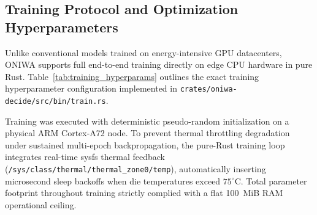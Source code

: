 \documentclass[10pt,twocolumn,letterpaper]{article}
\begin{document}
\subsection{Training Protocol and Optimization Hyperparameters}
Unlike conventional models trained on energy-intensive GPU datacenters, ONIWA supports full end-to-end training directly on edge CPU hardware in pure Rust. Table~\ref{tab:training_hyperparams} outlines the exact training hyperparameter configuration implemented in \texttt{crates/oniwa-decide/src/bin/train.rs}.

\begin{table}[htbp]
\centering
\caption{Training hyperparameters and optimization configuration.}
\label{tab:training_hyperparams}
\end{table}

Training was executed with deterministic pseudo-random initialization on a physical ARM Cortex-A72 node. To prevent thermal throttling degradation under sustained multi-epoch backpropagation, the pure-Rust training loop integrates real-time sysfs thermal feedback (\texttt{/sys/class/thermal/thermal\_zone0/temp}), automatically inserting microsecond sleep backoffs when die temperatures exceed $75^\circ\text{C}$. Total parameter footprint throughout training strictly complied with a flat 100~MiB RAM operational ceiling.
\end{document}

